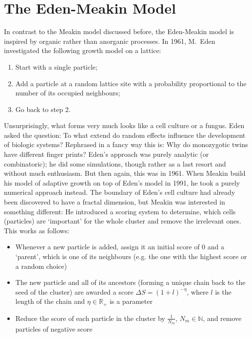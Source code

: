 \documentclass[twocolumn, 10pt]{scrartcl}
\begin{document}
    \section{The Eden-Meakin Model}

        In contrast to the Meakin model discussed before, the Eden-Meakin model is inspired by organic rather than
        anorganic processes. In 1961, M.~Eden investigated the following growth model on a lattice:
        \begin{enumerate}
            \item Start with a single particle;
            \item Add a particle at a random lattice site with a probability proportional to the number of its
                occupied neighbours;
            \item Go back to step 2.
        \end{enumerate}
        Unsurprisingly, what forms very much looks like a cell culture or a fungus. Eden asked the question:
        To what extend do random effects influence the development of biologic systems? Rephrased in a fancy
        way this is: Why do monozygotic twins have different finger prints? Eden's approach was purely analytic
        (or combinatoric); he did some simulations, though rather as a last resort and without much enthusiasm.
        But then again, this was in 1961. When Meakin build his model of adaptive growth on top of Eden's model
        in 1991, he took a purely numerical approach instead. The boundary of Eden's cell culture had already
        been discovered to have a fractal dimension, but Meakin was interested in something different: He
        introduced a scoring system to determine, which cells (particles) are `important' for the whole cluster
        and remove the irrelevant ones. This works as follows:
        \begin{itemize}
            \item Whenever a new particle is added, assign it an initial score of 0 and a `parent', which is
                one of its neighbours (e.g. the one with the highest score or a random choice)
            \item The new particle and all of its ancestors (forming a unique chain back to the seed of the
                cluster) are awarded a score $\Delta S=(1+l)^{-\eta}$, where $l$ is the length of the chain
                and $\eta\in\mathbb{R}_+$ is a parameter
            \item Reduce the score of each particle in the cluster by $\frac{1}{N_m}$, $N_m\in\mathbb{N}$,
                and remove particles of negative score
        \end{itemize}
\end{document}
